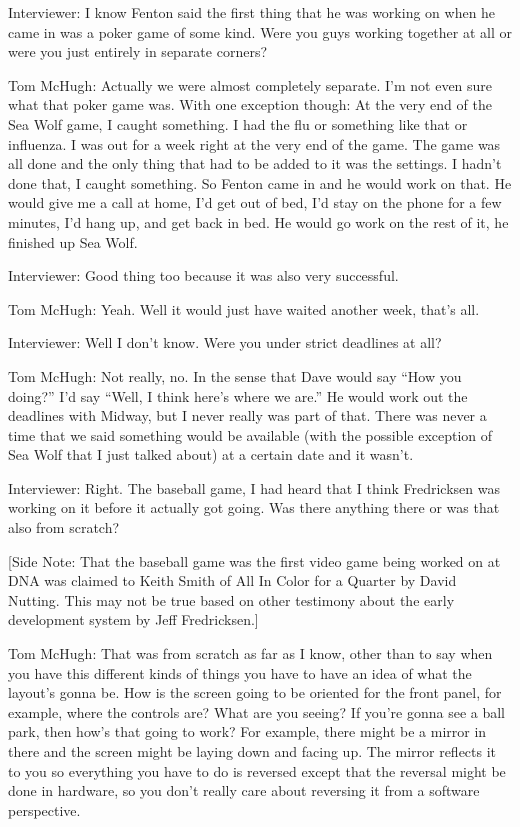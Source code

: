 \textcolor{interviewer}{Interviewer:} I know Fenton said the first thing that he was working on when he came in was a poker game of some kind. Were you guys working together at all or were you just entirely in separate corners?

\textcolor{interviewee}{Tom McHugh:} Actually we were almost completely separate. I’m not even sure what that poker game was. With one exception though: At the very end of the Sea Wolf game, I caught something. I had the flu or something like that or influenza. I was out for a week right at the very end of the game. The game was all done and the only thing that had to be added to it was the settings. I hadn’t done that, I caught something. So Fenton came in and he would work on that. He would give me a call at home, I’d get out of bed, I’d stay on the phone for a few minutes, I’d hang up, and get back in bed. He would go work on the rest of it, he finished up Sea Wolf.

\textcolor{interviewer}{Interviewer:} Good thing too because it was also very successful.

\textcolor{interviewee}{Tom McHugh:} Yeah. Well it would just have waited another week, that’s all.

\textcolor{interviewer}{Interviewer:} Well I don’t know. Were you under strict deadlines at all?

\textcolor{interviewee}{Tom McHugh:} Not really, no. In the sense that Dave would say “How you doing?” I’d say “Well, I think here’s where we are.” He would work out the deadlines with Midway, but I never really was part of that. There was never a time that we said something would be available (with the possible exception of Sea Wolf that I just talked about) at a certain date and it wasn’t.

\textcolor{interviewer}{Interviewer:} Right. The baseball game, I had heard that I think Fredricksen was working on it before it actually got going. Was there anything there or was that also from scratch?

[Side Note: That the baseball game was the first video game being worked on at DNA was claimed to Keith Smith of All In Color for a Quarter by David Nutting. This may not be true based on other testimony about the early development system by Jeff Fredricksen.]

\textcolor{interviewee}{Tom McHugh:} That was from scratch as far as I know, other than to say when you have this different kinds of things you have to have an idea of what the layout’s gonna be. How is the screen going to be oriented for the front panel, for example, where the controls are? What are you seeing? If you’re gonna see a ball park, then how’s that going to work? For example, there might be a mirror in there and the screen might be laying down and facing up. The mirror reflects it to you so everything you have to do is reversed except that the reversal might be done in hardware, so you don’t really care about reversing it from a software perspective.

